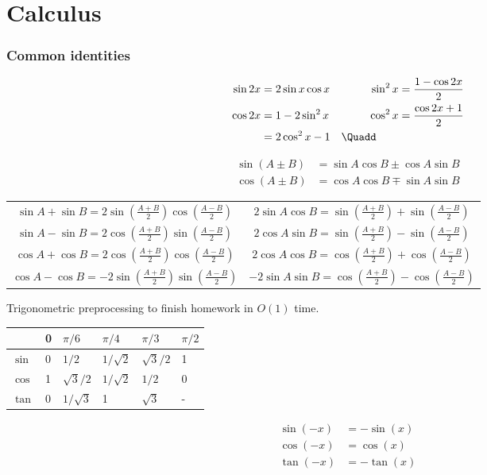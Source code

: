 \chapter{Calculus}\label{cbe77ad}

\subsection{Common identities}\label{c74a9a5}

\label{c1fe42f}

\begin{alignat*}{3}
  \sin2x & =2\sin x\cos x & \sin^2x          & =\frac{1-\cos2x}2 \\
  \cos2x & =1-2\sin^2x    & \cos^2x          & =\frac{\cos2x+1}2 \\
         & =2\cos^2x-1    & \Quadd\quad\quad &
\end{alignat*}

\begin{align*}
  \sin(A\pm B) &=\sin A\cos B\pm\cos A\sin B \\
  \cos(A\pm B) &=\cos A\cos B\mp\sin A\sin B
\end{align*}

\begin{center}
  \renewcommand{\arraystretch}{1.5}
  \begin{tabular}{c|c}
    $\sin A+\sin B =2\sin(\frac{A+B}2)\cos(\frac{A-B}2)$  & $2\sin A\cos B=\sin(\frac{A+B}2)+\sin(\frac{A-B}2)$  \\
    $\sin A-\sin B =2\cos(\frac{A+B}2)\sin(\frac{A-B}2)$  & $2\cos A\sin B=\sin(\frac{A+B}2)-\sin(\frac{A-B}2)$  \\
    $\cos A+\cos B =2\cos(\frac{A+B}2)\cos(\frac{A-B}2)$  & $2\cos A\cos B=\cos(\frac{A+B}2)+\cos(\frac{A-B}2)$  \\
    $\cos A-\cos B =-2\sin(\frac{A+B}2)\sin(\frac{A-B}2)$ & $-2\sin A\sin B=\cos(\frac{A+B}2)-\cos(\frac{A-B}2)$ \\
  \end{tabular}
\end{center}

\label{e1c170b}

Trigonometric preprocessing to finish homework in $O(1)$ time.

\begin{tabular}
  {|p{1cm}|p{1cm}|p{1cm}|p{1cm}|p{1cm}|p{1cm}|}
  \hline
         & 0 & $\pi/6$    & $\pi/4$    & $\pi/3$    & $\pi/2$ \\[0.2em]\hline
  $\sin$ & 0 & $1/2$      & $1/\sqrt2$ & $\sqrt3/2$ & 1       \\[0.2em]\hline
  $\cos$ & 1 & $\sqrt3/2$ & $1/\sqrt2$ & $1/2$      & 0       \\[0.2em]\hline
  $\tan$ & 0 & $1/\sqrt3$ & 1          & $\sqrt3$   & -       \\[0.2em]\hline
\end{tabular}
\begin{align*}
  \sin(-x) &=-\sin(x) \\
  \cos(-x) &=\cos(x)  \\
  \tan(-x) &=-\tan(x)
\end{align*}

